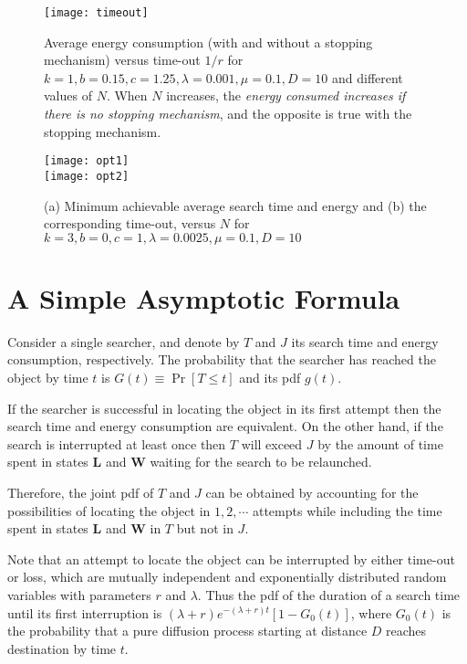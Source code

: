 \documentclass[journal]{IEEEtran}
\begin{document}
\begin{figure}[t]\centering
   \texttt{[image: timeout]}
   \caption{Average energy consumption (with and without a stopping mechanism) versus time-out $1/r$ for $k=1, b=0.15, c=1.25, \lambda=0.001, \mu=0.1, D=10$ and different values of $N$. When $N$ increases, the {\em energy consumed increases if there is no stopping mechanism}, and the opposite is true with the stopping mechanism.}\label{timeout}
\end{figure}


\begin{figure}\centering
   \texttt{[image: opt1]}\\\vspace{0.2in}
   \texttt{[image: opt2]}
   \caption{(a) Minimum achievable average search time and energy and (b) the corresponding time-out, versus $N$ for $k=3, b=0, c=1, \lambda=0.0025, \mu=0.1, D=10$}\label{Opt}
\end{figure}




\section{A Simple Asymptotic Formula}  \label{asymptot1}

Consider a single searcher, and denote by $T$ and $J$ its search time and energy consumption, respectively. The probability that the searcher has reached the object by time $t$ is $G(t)\equiv \Pr[T\leq t]$ and its pdf $g(t)$.

If the searcher is successful in locating the object in its first attempt then the search time and energy consumption are equivalent. On the other hand, if the search is interrupted at least once then $T$ will exceed $J$ by the amount of time spent in states $\mathbf{L}$ and $\mathbf{W}$ waiting for the search to be relaunched.

Therefore, the joint pdf of $T$ and $J$ can be obtained by accounting for the possibilities of locating the object in $1,2,\cdots$ attempts while including the time spent in states $\mathbf{L}$ and $\mathbf{W}$ in $T$ but not in $J$.

Note that an attempt to locate the object can be interrupted by either time-out or loss, which are mutually independent and exponentially distributed random variables with parameters $r$ and $\lambda$. Thus the pdf of the duration of a search time until its first interruption is $(\lambda+r)e^{-(\lambda+r)t}[1-G_0(t)]$, where $G_0(t)$ is the probability that a pure diffusion process starting at distance $D$ reaches destination by time $t$.
\end{document}
